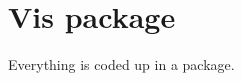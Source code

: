 \documentclass[12pt]{article}
\newenvironment{Shaded}{\begin{snugshade}}{\end{snugshade}}
\newcommand{\DataTypeTok}[1]{\textcolor[rgb]{0.13,0.29,0.53}{#1}}
\newcommand{\KeywordTok}[1]{\textcolor[rgb]{0.13,0.29,0.53}{\textbf{#1}}}
\newcommand{\NormalTok}[1]{#1}
\newcommand{\OperatorTok}[1]{\textcolor[rgb]{0.81,0.36,0.00}{\textbf{#1}}}
\newcommand{\OtherTok}[1]{\textcolor[rgb]{0.56,0.35,0.01}{#1}}
\newcommand{\StringTok}[1]{\textcolor[rgb]{0.31,0.60,0.02}{#1}}
\begin{document}
\begin{Shaded}
\end{Shaded}

\hypertarget{vis-package}{%
\section{Vis package}\label{vis-package}}

Everything is coded up in a package.

\clearpage



\end{document}

